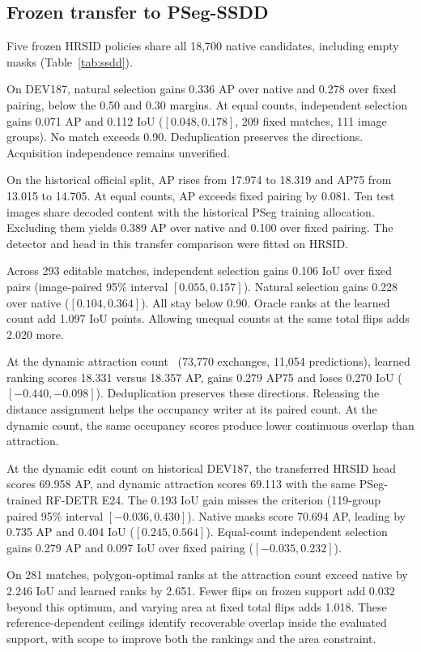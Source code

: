 \documentclass[journal]{IEEEtran}
\begin{document}
\subsection{Frozen transfer to PSeg-SSDD}
Five frozen HRSID policies share all 18,700 native candidates, including empty masks (Table~\ref{tab:ssdd}).


On DEV187, natural selection gains 0.336 AP over native and 0.278 over fixed pairing, below the 0.50 and 0.30 margins. At equal counts, independent selection gains 0.071 AP and 0.112 IoU (\([0.048,0.178]\), 209 fixed matches, 111 image groups). No match exceeds 0.90. Deduplication preserves the directions. Acquisition independence remains unverified.

On the historical official split, AP rises from 17.974 to 18.319 and AP75 from 13.015 to 14.705. At equal counts, AP exceeds fixed pairing by 0.081. Ten test images share decoded content with the historical PSeg training allocation. Excluding them yields 0.389 AP over native and 0.100 over fixed pairing. The detector and head in this transfer comparison were fitted on HRSID.

Across 293 editable matches, independent selection gains 0.106 IoU over fixed pairs (image-paired 95\% interval \mbox{\([0.055,0.157]\)}). Natural selection gains 0.228 over native (\([0.104,0.364]\)). All stay below 0.90. Oracle ranks at the learned count add 1.097 IoU points. Allowing unequal counts at the same total flips adds 2.020 more.

At the dynamic attraction count~\cite{atkinson} (73,770 exchanges, 11,054 predictions), learned ranking scores 18.331 versus 18.357 AP, gains 0.279 AP75 and loses 0.270 IoU (\([-0.440,-0.098]\)). Deduplication preserves these directions. Releasing the distance assignment helps the occupancy writer at its paired count. At the dynamic count, the same occupancy scores produce lower continuous overlap than attraction.

At the dynamic edit count on historical DEV187, the transferred HRSID head scores 69.958 AP, and dynamic attraction scores 69.113 with the same PSeg-trained RF-DETR E24. The 0.193 IoU gain misses the criterion (119-group paired 95\% interval \([-0.036,0.430]\)). Native masks score 70.694 AP, leading by 0.735 AP and 0.404 IoU (\([0.245,0.564]\)). Equal-count independent selection gains 0.279 AP and 0.097 IoU over fixed pairing (\([-0.035,0.232]\)).

On 281 matches, polygon-optimal ranks at the attraction count exceed native by 2.246 IoU and learned ranks by 2.651. Fewer flips on frozen support add 0.032 beyond this optimum, and varying area at fixed total flips adds 1.018. These reference-dependent ceilings identify recoverable overlap inside the evaluated support, with scope to improve both the rankings and the area constraint.
\end{document}
